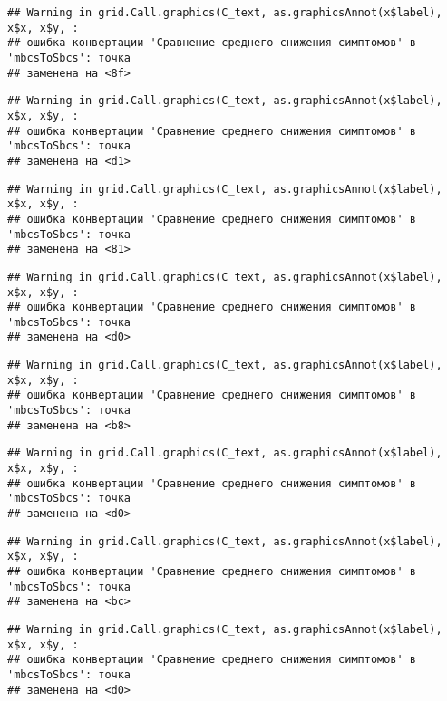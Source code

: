 \documentclass[
]{article}
\begin{document}
\begin{verbatim}
## Warning in grid.Call.graphics(C_text, as.graphicsAnnot(x$label), x$x, x$y, :
## ошибка конвертации 'Сравнение среднего снижения симптомов' в 'mbcsToSbcs': точка
## заменена на <8f>
\end{verbatim}

\begin{verbatim}
## Warning in grid.Call.graphics(C_text, as.graphicsAnnot(x$label), x$x, x$y, :
## ошибка конвертации 'Сравнение среднего снижения симптомов' в 'mbcsToSbcs': точка
## заменена на <d1>
\end{verbatim}

\begin{verbatim}
## Warning in grid.Call.graphics(C_text, as.graphicsAnnot(x$label), x$x, x$y, :
## ошибка конвертации 'Сравнение среднего снижения симптомов' в 'mbcsToSbcs': точка
## заменена на <81>
\end{verbatim}

\begin{verbatim}
## Warning in grid.Call.graphics(C_text, as.graphicsAnnot(x$label), x$x, x$y, :
## ошибка конвертации 'Сравнение среднего снижения симптомов' в 'mbcsToSbcs': точка
## заменена на <d0>
\end{verbatim}

\begin{verbatim}
## Warning in grid.Call.graphics(C_text, as.graphicsAnnot(x$label), x$x, x$y, :
## ошибка конвертации 'Сравнение среднего снижения симптомов' в 'mbcsToSbcs': точка
## заменена на <b8>
\end{verbatim}

\begin{verbatim}
## Warning in grid.Call.graphics(C_text, as.graphicsAnnot(x$label), x$x, x$y, :
## ошибка конвертации 'Сравнение среднего снижения симптомов' в 'mbcsToSbcs': точка
## заменена на <d0>
\end{verbatim}

\begin{verbatim}
## Warning in grid.Call.graphics(C_text, as.graphicsAnnot(x$label), x$x, x$y, :
## ошибка конвертации 'Сравнение среднего снижения симптомов' в 'mbcsToSbcs': точка
## заменена на <bc>
\end{verbatim}

\begin{verbatim}
## Warning in grid.Call.graphics(C_text, as.graphicsAnnot(x$label), x$x, x$y, :
## ошибка конвертации 'Сравнение среднего снижения симптомов' в 'mbcsToSbcs': точка
## заменена на <d0>
\end{verbatim}
\end{document}
